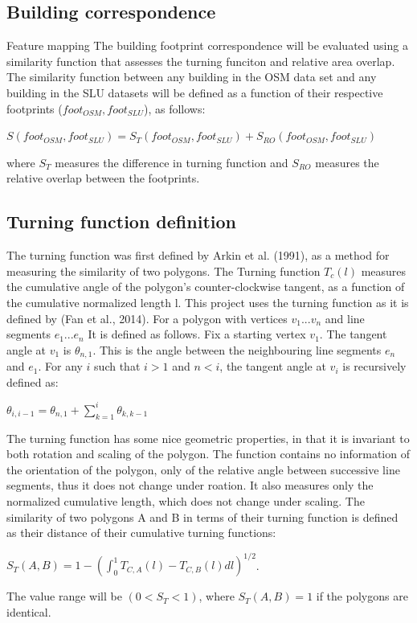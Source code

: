 \documentclass[a4paper]{article}
\begin{document}
\subsection{Building correspondence}

Feature mapping
The building footprint correspondence will be evaluated using a similarity function that assesses the turning funciton and relative area overlap. The similarity function between any building in the OSM data set and any building in the SLU datasets will be defined as a function of their respective footprints ($foot_{OSM}, foot_{SLU}$), as follows:
\begin{center}
    $S(foot_{OSM}, foot_{SLU}) = S_{T}(foot_{OSM}, foot_{SLU}) + S_{RO}(foot_{OSM}, foot_{SLU})$
\end{center}
where $S_{T}$ measures the difference in turning function and $S_{RO}$ measures the relative overlap between the footprints.

\subsection{Turning function definition}

The turning function was first defined by Arkin et al. (1991), as a method for measuring the similarity of two polygons. The Turning function $T_c(l)$ measures the cumulative angle of the polygon's counter-clockwise tangent, as a function of the cumulative normalized length l. This project uses the turning function as it is defined by (Fan et al., 2014). For a polygon with vertices ${v_1 ... v_n}$ and line segments ${e_1 ... e_n}$ It is defined as follows.
Fix a starting vertex $v_1$.
The tangent angle at $v_1$ is $\theta_{n,1}$. This is the angle between the neighbouring line segments $e_n$ and $e_1$.
For any $i$ such that $i>1$ and $n<i$, the tangent angle at $v_i$ is recursively defined as:
\begin{center}
    $\theta_{i, i-1} = \theta_{n,1} + \sum^{i}_{k=1} \theta_{k, k-1}$
\end{center}
The turning function has some nice geometric properties, in that it is invariant to both rotation and scaling of the polygon. The function contains no information of the orientation of the polygon, only of the relative angle between successive line segments, thus it does not change under roation. It also measures only the normalized cumulative length, which does not change under scaling.
The similarity of two polygons A and B in terms of their turning function is defined as their distance of their cumulative turning functions:
\begin{center}
    $S_{T}(A, B) = 1 - (\int^{1}_{0} T_{C,A}(l) - T_{C,B}(l) dl)^{1/2}$.
\end{center}
The value range will be $(0 < S_{T} < 1)$, where $S_{T}(A,B) = 1$ if the polygons are identical. 
\end{document}
